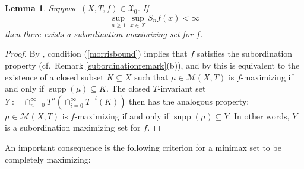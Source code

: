 \documentclass[reqno,11pt]{amsart}
\newtheorem{lem}[thm]{Lemma}
\theoremstyle{definition}
\theoremstyle{remark}
\theoremstyle{remark}
\def\m{\mathcal M}
\newcommand{\supp}{\operatorname{supp}}
\def\X{\mathfrak{X}}
\numberwithin{equation}{section}
\begin{document}
\begin{lem}\label{morrislemma}
Suppose $(X,T,f)\in\X_0$.
If
\begin{equation}\label{morrisbound}
\sup_{n\ge1} \sup_{x\in X} S_n f(x) 
< \infty
\end{equation}
then there exists a subordination maximizing set for $f$.
\end{lem}
\begin{proof}
By \cite[Thm.~1]{M07}, 
condition (\ref{morrisbound}) implies that $f$ satisfies the subordination property
(cf.~Remark \ref{subordinationremark}(b)),
and by \cite[Prop.~1]{M07} this is equivalent to the existence of a closed subset $K\subseteq X$
such that $\mu\in\m(X,T)$ is $f$-maximizing if and only if $\supp(\mu)\subseteq K$.
The closed $T$-invariant set $Y:= \cap_{n=0}^\infty T^n \left( \cap_{i=0}^\infty T^{-i}(K) \right)$ then has the analogous property:
$\mu\in\m(X,T)$ is $f$-maximizing if and only if $\supp(\mu)\subseteq Y$.
In other words, $Y$ is a
subordination maximizing set
for $f$.
\end{proof}







An important consequence is the following criterion
for a minimax set to be completely maximizing:
\end{document}
